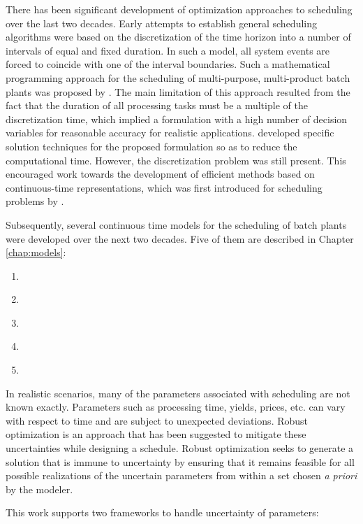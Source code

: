 There has been significant development of optimization approaches to scheduling over the last two decades. Early attempts to establish general scheduling algorithms were based on the discretization of the time horizon into a number of intervals of equal and fixed duration. In such a model, all system events are forced to coincide with one of the interval boundaries. 
Such a mathematical programming approach for the scheduling of multi-purpose, multi-product batch plants was proposed by \cite{KONDILI1993211}. The main limitation of this approach resulted from the fact that the duration of all processing tasks must be a multiple of the discretization time, which implied a formulation with a high number of decision variables for reasonable accuracy for realistic applications.
\cite{SHAH1993229} developed specific solution techniques for the proposed formulation so as to reduce the computational time. However, the discretization problem was still present. This encouraged work towards the development of efficient methods based on continuous-time representations, which was first introduced for scheduling problems by \cite{SAHINIDIS199185}.

Subsequently, several continuous time models for the scheduling of batch plants were developed over the next two decades. Five of them are described in Chapter \ref{chap:models}:
\begin{enumerate}
\item \cite{Castro}
\item \cite{Maravelias}
\item \cite{Gimenez}
\item \cite{Ierapetritou}
\item \cite{Karimi}
\end{enumerate}

\label{uncertaintysection}
In realistic scenarios, many of the parameters associated with scheduling are not known exactly. Parameters such as processing time, yields, prices, etc. can vary with respect to time and are subject to unexpected deviations. Robust optimization is an approach that has been suggested to mitigate these uncertainties while designing a schedule. Robust optimization seeks to generate a solution that is immune to uncertainty by ensuring that it remains feasible for all possible realizations of the uncertain parameters from within a set chosen \emph{a priori} by the modeler.

This work supports two frameworks to handle uncertainty of parameters:


